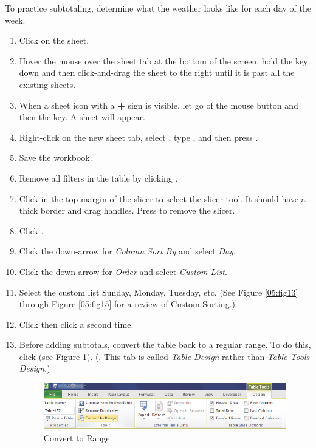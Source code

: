 To practice subtotaling, determine what the weather looks like for each day of the week.

\begin{enumbox}
	\begin{enumerate}
		\item Click on the  sheet.
		\item Hover the mouse over the  sheet tab at the bottom of the screen, hold the  key down and then click-and-drag the sheet to the right until it is past all the existing sheets.
		\item When a sheet icon with a \textbf{+} sign is visible, let go of the mouse button and then the  key. A  sheet will appear.
		\item Right-click on the new sheet tab, select , type , and then press .
		\item Save the  workbook.
		\item Remove all filters in the table by clicking .
		\item Click in the top margin of the slicer to select the slicer tool. It should have a thick border and drag handles. Press  to remove the slicer.
	
		\item Click . 
		\item Click the down-arrow for \textit{Column Sort By} and select \textit{Day}.
		\item Click the down-arrow for \textit{Order} and select \textit{Custom List}.
		\item Select the custom list Sunday, Monday, Tuesday, etc. (See Figure \ref{05:fig13} through Figure \ref{05:fig15} for a review of Custom Sorting.)
		\item Click  then click  a second time.
		\item Before adding subtotals, convert the table back to a regular range. To do this, click  (see Figure \ref{05:fig23}). (. This tab is called \textit{Table Design} rather than \textit{Table Tools Design}.)

		\begin{figure}[H]
			\centering
			\includegraphics[width=\maxwidth{.95\linewidth}]{gfx/ch05_fig23}
			\caption{Convert to Range}
			\label{05:fig23}
		\end{figure}


\end{enumerate}
\end{enumbox}
